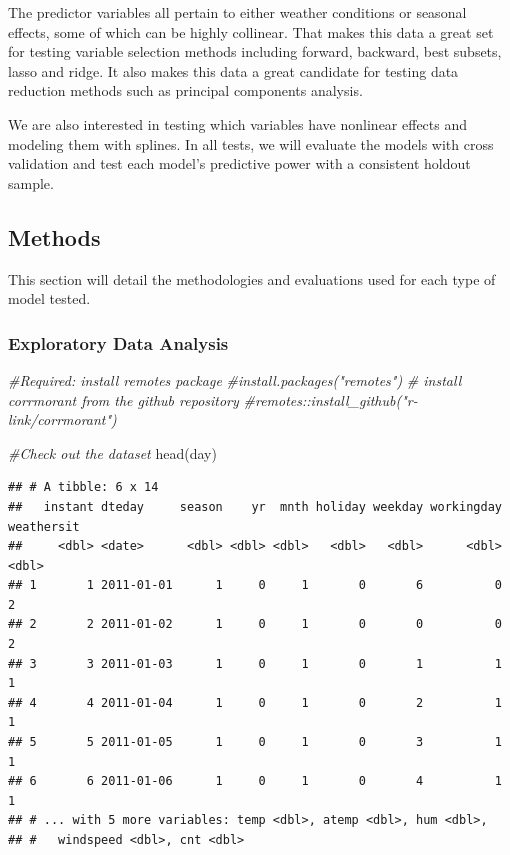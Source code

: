 \documentclass[
]{article}
\newenvironment{Shaded}{\begin{snugshade}}{\end{snugshade}}
\newcommand{\CommentTok}[1]{\textcolor[rgb]{0.56,0.35,0.01}{\textit{#1}}}
\newcommand{\FunctionTok}[1]{\textcolor[rgb]{0.00,0.00,0.00}{#1}}
\newcommand{\NormalTok}[1]{#1}
\begin{document}
The predictor variables all pertain to either weather conditions or
seasonal effects, some of which can be highly collinear. That makes this
data a great set for testing variable selection methods including
forward, backward, best subsets, lasso and ridge. It also makes this
data a great candidate for testing data reduction methods such as
principal components analysis.

We are also interested in testing which variables have nonlinear effects
and modeling them with splines. In all tests, we will evaluate the
models with cross validation and test each model's predictive power with
a consistent holdout sample.

\hypertarget{methods}{%
\subsection{Methods}\label{methods}}

This section will detail the methodologies and evaluations used for each
type of model tested.

\hypertarget{exploratory-data-analysis}{%
\subsubsection{Exploratory Data
Analysis}\label{exploratory-data-analysis}}

\begin{Shaded}
\begin{Highlighting}[]
\CommentTok{\#Required: install remotes package }
\CommentTok{\#install.packages("remotes")}
\CommentTok{\# install corrmorant from the github repository}
\CommentTok{\#remotes::install\_github("r{-}link/corrmorant")}

\CommentTok{\#Check out the dataset}
\FunctionTok{head}\NormalTok{(day)}
\end{Highlighting}
\end{Shaded}

\begin{verbatim}
## # A tibble: 6 x 14
##   instant dteday     season    yr  mnth holiday weekday workingday weathersit
##     <dbl> <date>      <dbl> <dbl> <dbl>   <dbl>   <dbl>      <dbl>      <dbl>
## 1       1 2011-01-01      1     0     1       0       6          0          2
## 2       2 2011-01-02      1     0     1       0       0          0          2
## 3       3 2011-01-03      1     0     1       0       1          1          1
## 4       4 2011-01-04      1     0     1       0       2          1          1
## 5       5 2011-01-05      1     0     1       0       3          1          1
## 6       6 2011-01-06      1     0     1       0       4          1          1
## # ... with 5 more variables: temp <dbl>, atemp <dbl>, hum <dbl>,
## #   windspeed <dbl>, cnt <dbl>
\end{verbatim}
\end{document}
